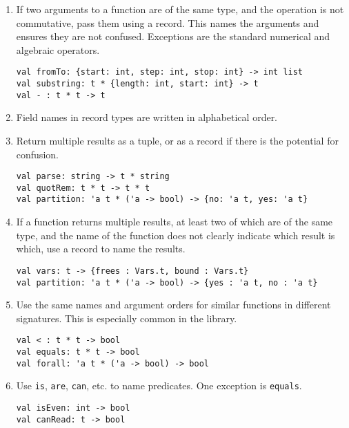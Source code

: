 \documentclass[12pt]{article}
\begin{document}
\begin{enumerate}
\item
If two arguments to a function are of the same type, and the operation is not
commutative, pass them using a record.  This names the arguments and ensures
they are not confused.  Exceptions are the standard numerical and algebraic
operators.
\begin{verbatim}
val fromTo: {start: int, step: int, stop: int} -> int list
val substring: t * {length: int, start: int} -> t
val - : t * t -> t
\end{verbatim}

\item
Field names in record types are written in alphabetical order.

\item
Return multiple results as a tuple, or as a record if there is the potential for
confusion.
\begin{verbatim}
val parse: string -> t * string
val quotRem: t * t -> t * t
val partition: 'a t * ('a -> bool) -> {no: 'a t, yes: 'a t}
\end{verbatim}

\item
If a function returns multiple results, at least two of which are of the same
type, and the name of the function does not clearly indicate which result is
which, use a record to name the results.
\begin{verbatim}
val vars: t -> {frees : Vars.t, bound : Vars.t}
val partition: 'a t * ('a -> bool) -> {yes : 'a t, no : 'a t}
\end{verbatim}

\item
Use the same names and argument orders for similar functions in different
signatures.  This is especially common in the {\mlton} library.
\begin{verbatim}
val < : t * t -> bool
val equals: t * t -> bool
val forall: 'a t * ('a -> bool) -> bool
\end{verbatim}

\item
Use {\tt is}, {\tt are}, {\tt can}, etc. to name predicates.  One exception is
{\tt equals}.
\begin{verbatim}
val isEven: int -> bool
val canRead: t -> bool
\end{verbatim}

\end{enumerate}

\end{document}
